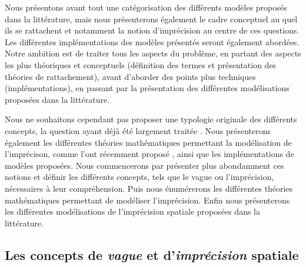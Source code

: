 Nous présentons avant tout une catégorisation des différents modèles
proposés dans la littérature, mais nous présenterons également le
cadre conceptuel au quel ils se rattachent et notamment la notion
d’imprécision au centre de ces questions. Les différentes
implémentations des modèles présentés seront également abordées. Notre
ambition est de traiter tous les aspects du problème, en partant des
aspects les plus théoriques et conceptuels (définition des termes et
présentation des théories de rattachement), avant d’aborder des points
plus techniques (implémentations), en passant par la présentation des
différentes modélisations proposées dans la littérature.

Nous ne souhaitons cependant pas proposer une typologie originale des
différents concepts, la question ayant déjà été largement traitée
\autocite{Bouchon-Meunier1995,Fisher2006,Devilliers2019}. Nous
présenterons également les différentes théories mathématiques
permettant la modélisation de l’imprécison, comme l’ont récemment
proposé \textcite{Batton-Hubert2019}, ainsi que les implémentations de
modèles proposées.  Nous commencerons par présenter plus abondamment
ces notions et définir les différents concepts, tels que le vague ou
l’imprécision, nécessaires à leur compréhension. Puis nous énumérerons
les différentes théories mathématiques permettant de modéliser
l’imprécision. Enfin nous présenterons les différentes modélisations
de l’imprécision spatiale proposées dans la littérature.


\subsection{Les concepts de \emph{vague} et d’\emph{imprécision}
  spatiale}

